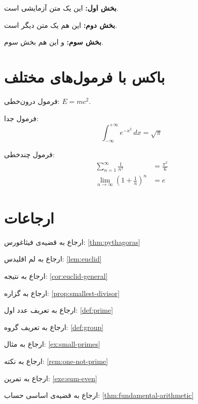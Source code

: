 \documentclass{matinbook}
\begin{document}
\begin{theorem}
    \textbf{بخش اول:} این یک متن آزمایشی است.

    \textbf{بخش دوم:} این هم یک متن دیگر است.

    \textbf{بخش سوم:} و این هم بخش سوم.
\end{theorem}

\section{باکس با فرمول‌های مختلف}
\label{sec:boxes-with-formulas}

\begin{example}
    فرمول درون‌خطی: $E = mc^2$.

    فرمول جدا:
    \[
    \int_{-\infty}^{+\infty} e^{-x^2} \, dx = \sqrt{\pi}
    \]

    فرمول چندخطی:
    \begin{align*}
        \sum_{n=1}^{\infty} \frac{1}{n^2} &= \frac{\pi^2}{6} \\
        \lim_{n \to \infty} \left(1 + \frac{1}{n}\right)^n &= e
    \end{align*}
\end{example}

\section{ارجاعات}
\label{sec:references}

ارجاع به قضیه‌ی فیثاغورس: \cref{thm:pythagoras}

ارجاع به لم اقلیدس: \cref{lem:euclid}

ارجاع به نتیجه: \cref{cor:euclid-general}

ارجاع به گزاره: \cref{prop:smallest-divisor}

ارجاع به تعریف عدد اول: \cref{def:prime}

ارجاع به تعریف گروه: \cref{def:group}

ارجاع به مثال: \cref{ex:small-primes}

ارجاع به نکته: \cref{rem:one-not-prime}

ارجاع به تمرین: \cref{exe:sum-even}

ارجاع به قضیه‌ی اساسی حساب: \cref{thm:fundamental-arithmetic}

\end{document}
